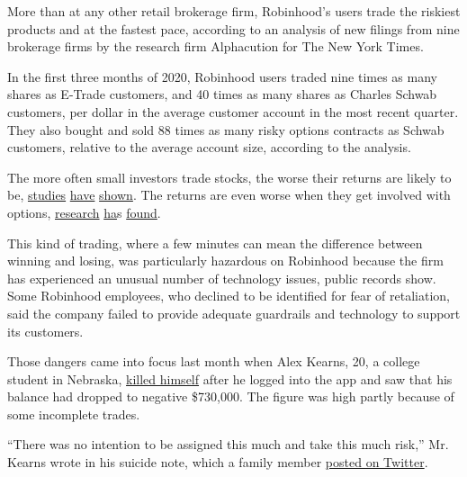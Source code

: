 More than at any other retail brokerage firm, Robinhood's users trade
the riskiest products and at the fastest pace, according to an analysis
of new filings from nine brokerage firms by the research firm
Alphacution for The New York Times.

In the first three months of 2020, Robinhood users traded nine times as
many shares as E-Trade customers, and 40 times as many shares as Charles
Schwab customers, per dollar in the average customer account in the most
recent quarter. They also bought and sold 88 times as many risky options
contracts as Schwab customers, relative to the average account size,
according to the analysis.

The more often small investors trade stocks, the worse their returns are
likely to be,
\href{https://www.sciencedirect.com/science/article/abs/pii/S1386418113000190}{studies}
\href{http://citeseerx.ist.psu.edu/viewdoc/download?doi=10.1.1.408.1468\&rep=rep1\&type=pdf}{have}
\href{https://www.sciencedirect.com/science/article/abs/pii/S1386418113000190}{shown}.
The returns are even worse when they get involved with options,
\href{https://www.nytimes.com/2013/05/25/business/growth-in-options-trading-helps-brokers-but-not-small-investors.html}{research}
\href{https://papers.ssrn.com/sol3/papers.cfm?abstract_id=965810}{ha}s
\href{https://www.sciencedirect.com/science/article/abs/pii/S0378426614003501}{found}.

This kind of trading, where a few minutes can mean the difference
between winning and losing, was particularly hazardous on Robinhood
because the firm has experienced an unusual number of technology issues,
public records show. Some Robinhood employees, who declined to be
identified for fear of retaliation, said the company failed to provide
adequate guardrails and technology to support its customers.

Those dangers came into focus last month when Alex Kearns, 20, a college
student in Nebraska,
\href{https://www.forbes.com/sites/sergeiklebnikov/2020/06/17/20-year-old-robinhood-customer-dies-by-suicide-after-seeing-a-730000-negative-balance/\#bbc1cfb16384}{killed
himself} after he logged into the app and saw that his balance had
dropped to negative \$730,000. The figure was high partly because of
some incomplete trades.

``There was no intention to be assigned this much and take this much
risk,'' Mr. Kearns wrote in his suicide note, which a family member
\href{https://twitter.com/BillBrewsterSCG/status/1273292130769932288?s=20}{posted
on Twitter}.

